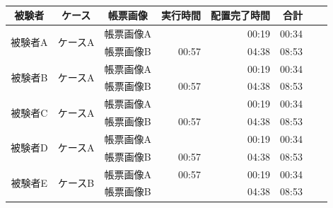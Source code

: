 \begin{table}[tp]
	\caption{}
	\label{tb:result}
	\centering
	\begin{tabular}{ccc||rrrr|r}
		被験者 & ケース & 帳票画像 & 実行時間 & 配置完了時間 & 合計 \\
        \hline \hline

		\multirow{2}{*}{被験者A} & \multirow{2}{*}{ケースA} & 帳票画像A &  & 00:19 & 00:34 \\
		                        &                          & 帳票画像B & 00:57 & 04:38 & 08:53 \\
                                                           \hline

		\multirow{2}{*}{被験者B} & \multirow{2}{*}{ケースA} & 帳票画像A &  & 00:19 & 00:34 \\
                                &                          & 帳票画像B & 00:57 & 04:38 & 08:53 \\
                                                           \hline

		\multirow{2}{*}{被験者C} & \multirow{2}{*}{ケースA} & 帳票画像A &  & 00:19 & 00:34 \\
                                &                          & 帳票画像B & 00:57 & 04:38 & 08:53 \\
                                                           \hline

		\multirow{2}{*}{被験者D} & \multirow{2}{*}{ケースA} & 帳票画像A &  & 00:19 & 00:34 \\
                                &                          & 帳票画像B & 00:57 & 04:38 & 08:53 \\
                                                           \hline

		\multirow{2}{*}{被験者E} & \multirow{2}{*}{ケースB} & 帳票画像A & 00:57 & 00:19 & 00:34 \\
                                &                          & 帳票画像B & & 04:38 & 08:53 \\
                                                           \hline


\end{tabular}
\end{table}
